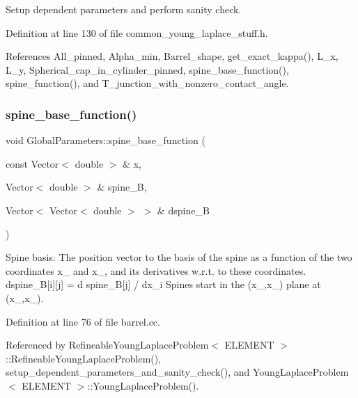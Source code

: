 Setup dependent parameters and perform sanity check. 



Definition at line 130 of file common\+\_\+young\+\_\+laplace\+\_\+stuff.\+h.



References All\+\_\+pinned, Alpha\+\_\+min, Barrel\+\_\+shape, get\+\_\+exact\+\_\+kappa(), L\+\_\+x, L\+\_\+y, Spherical\+\_\+cap\+\_\+in\+\_\+cylinder\+\_\+pinned, spine\+\_\+base\+\_\+function(), spine\+\_\+function(), and T\+\_\+junction\+\_\+with\+\_\+nonzero\+\_\+contact\+\_\+angle.

\mbox{\label{namespaceGlobalParameters_ac81daf87f8d3f075d9fd108427e70c4f}} 
\subsubsection{\texorpdfstring{spine\+\_\+base\+\_\+function()}{spine\_base\_function()}}
{\footnotesize\ttfamily void Global\+Parameters\+::spine\+\_\+base\+\_\+function (\begin{DoxyParamCaption}\item[{const Vector$<$ double $>$ \&}]{x,  }\item[{Vector$<$ double $>$ \&}]{spine\+\_\+B,  }\item[{Vector$<$ Vector$<$ double $>$ $>$ \&}]{dspine\+\_\+B }\end{DoxyParamCaption})}



Spine basis\+: The position vector to the basis of the spine as a function of the two coordinates x\+\_ and x\+\_, and its derivatives w.\+r.\+t. to these coordinates. dspine\+\_\+B\mbox{[}i\mbox{]}\mbox{[}j\mbox{]} = d spine\+\_\+B\mbox{[}j\mbox{]} / dx\+\_\+i Spines start in the (x\+\_,x\+\_) plane at (x\+\_,x\+\_). 



Definition at line 76 of file barrel.\+cc.



Referenced by Refineable\+Young\+Laplace\+Problem$<$ E\+L\+E\+M\+E\+N\+T $>$\+::\+Refineable\+Young\+Laplace\+Problem(), setup\+\_\+dependent\+\_\+parameters\+\_\+and\+\_\+sanity\+\_\+check(), and Young\+Laplace\+Problem$<$ E\+L\+E\+M\+E\+N\+T $>$\+::\+Young\+Laplace\+Problem().

